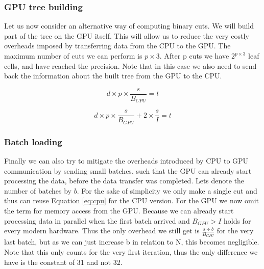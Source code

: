 \documentclass[]{article}
\begin{document}
\vspace{5mm}


\subsubsection{GPU tree building}

Let us now consider an alternative way of computing binary cuts. We will build part of the tree on the GPU itself. This will allow us to reduce the very costly overheads imposed by transferring data from the CPU to the GPU. The maximum number of cuts we can perform is $p \times 3$. After p cuts we have $2^{p \times 3}$ leaf cells, and have reached the precision. Note that in this case we also need to send back the information about the built tree from the GPU to the CPU. 

\begin{center}
	\begin{equation}
		d \times p \times \frac{s}{B_{CPU}} = t
		\label{eq:cputree}
	\end{equation}
\end{center}

\begin{center}
	\begin{equation}
		d \times p \times \frac{s}{B_{GPU}} + 2 \times \frac{s}{I} = t
		\label{eq:gputree}
	\end{equation}
\end{center}


\subsubsection{Batch loading}

Finally we can also try to mitigate the overheads introduced by CPU to GPU communication by sending small batches, such that the GPU can already start processing the data, before the data transfer was completed. Lets denote the number of batches by $b$. For the sake of simplicity we only make a single cut and thus can reuse Equation \ref{eq:cpu} for the CPU version. For the GPU we now omit the term for memory access from the GPU. Because we can already start processing data in parallel when the first batch arrived and $B_{GPU} > I$ holds for every modern hardware. Thus the only overhead we still get is $\frac{s \div b}{B_{GPU}}$ for the very last batch, but as we can just increase b in relation to N, this becomes negligible. Note that this only counts for the very first iteration, thus the only difference we have is the constant of 31 and not 32. 
\end{document}
